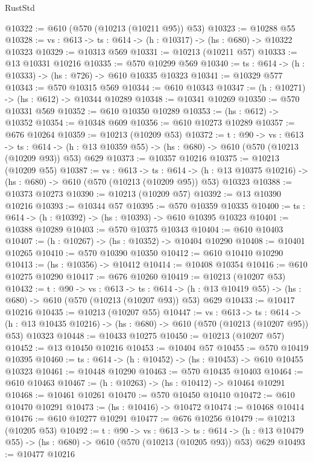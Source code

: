 \begin{lexlean}{RustStd}
\begin{coremodule}
@10322 := @610 (@570 (@10213 (@10211 @95)) @53)
@10323 := @10288 @55
@10328 := {vs : @613} -> {ts : @614} -> (h : @10317) -> (hs : @680) -> @10322 @10323
@10329 := @10313 @569
@10331 := @10213 (@10211 @57)
@10333 := @13 @10331 @10216
@10335 := @570 @10299 @569
@10340 := {ts : @614} -> (h : @10333) -> (hs : @726) -> @610 @10335 @10323
@10341 := @10329 @577
@10343 := @570 @10315 @569
@10344 := @610 @10343
@10347 := (h : @10271) -> (hs : @612) -> @10344 @10289
@10348 := @10341 @10269
@10350 := @570 @10331 @569
@10352 := @610 @10350 @10289
@10353 := (hs : @612) -> @10352
@10354 := @10348 @609
@10356 := @610 @10273 @10289
@10357 := @676 @10264
@10359 := @10213 (@10209 @53)
@10372 := {t : @90} ->
  {vs : @613} ->
  {ts : @614} -> (h : @13 @10359 @55) -> (hs : @680) -> @610 (@570 (@10213 (@10209 @93)) @53) @629
@10373 := @10357 @10216
@10375 := @10213 (@10209 @55)
@10387 := {vs : @613} ->
  {ts : @614} ->
  (h : @13 @10375 @10216) -> (hs : @680) -> @610 (@570 (@10213 (@10209 @95)) @53) @10323
@10388 := @10373 @10273
@10390 := @10213 (@10209 @57)
@10392 := @13 @10390 @10216
@10393 := @10344 @57
@10395 := @570 @10359 @10335
@10400 := {ts : @614} -> (h : @10392) -> (hs : @10393) -> @610 @10395 @10323
@10401 := @10388 @10289
@10403 := @570 @10375 @10343
@10404 := @610 @10403
@10407 := (h : @10267) -> (hs : @10352) -> @10404 @10290
@10408 := @10401 @10265
@10410 := @570 @10390 @10350
@10412 := @610 @10410 @10290
@10413 := (hs : @10356) -> @10412
@10414 := @10408 @10354
@10416 := @610 @10275 @10290
@10417 := @676 @10260
@10419 := @10213 (@10207 @53)
@10432 := {t : @90} ->
  {vs : @613} ->
  {ts : @614} -> (h : @13 @10419 @55) -> (hs : @680) -> @610 (@570 (@10213 (@10207 @93)) @53) @629
@10433 := @10417 @10216
@10435 := @10213 (@10207 @55)
@10447 := {vs : @613} ->
  {ts : @614} ->
  (h : @13 @10435 @10216) -> (hs : @680) -> @610 (@570 (@10213 (@10207 @95)) @53) @10323
@10448 := @10433 @10275
@10450 := @10213 (@10207 @57)
@10452 := @13 @10450 @10216
@10453 := @10404 @57
@10455 := @570 @10419 @10395
@10460 := {ts : @614} -> (h : @10452) -> (hs : @10453) -> @610 @10455 @10323
@10461 := @10448 @10290
@10463 := @570 @10435 @10403
@10464 := @610 @10463
@10467 := (h : @10263) -> (hs : @10412) -> @10464 @10291
@10468 := @10461 @10261
@10470 := @570 @10450 @10410
@10472 := @610 @10470 @10291
@10473 := (hs : @10416) -> @10472
@10474 := @10468 @10414
@10476 := @610 @10277 @10291
@10477 := @676 @10256
@10479 := @10213 (@10205 @53)
@10492 := {t : @90} ->
  {vs : @613} ->
  {ts : @614} -> (h : @13 @10479 @55) -> (hs : @680) -> @610 (@570 (@10213 (@10205 @93)) @53) @629
@10493 := @10477 @10216

\end{coremodule}
\end{lexlean}
